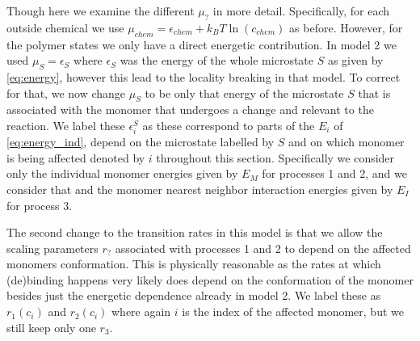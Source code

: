 \documentclass[11pt]{article}
\begin{document}
Though here we examine the different $\mu_?$ in more detail.
Specifically, for each outside chemical we use $\mu_{chem} = \epsilon_{chem}+\si{k_B}T\ln(c_{chem})$ as before.
However, for the polymer states we only have a direct energetic contribution.
In model 2 we used $\mu_S=\epsilon_S$ where $\epsilon_S$ was the energy of the whole microstate $S$ as given by \cref{eq:energy}, however this lead to the locality breaking in that model.
To correct for that, we now change $\mu_S$ to be only that energy of the microstate $S$ that is associated with the monomer that undergoes a change and relevant to the reaction.
We label these $\epsilon^S_i$ as these correspond to parts of the $E_i$ of \cref{eq:energy_ind}, depend on the microstate labelled by $S$ and on which monomer is being affected denoted by $i$ throughout this section.
Specifically we consider only the individual monomer energies given by $E_M$ for processes 1 and 2, and we consider that and the monomer nearest neighbor interaction energies given by $E_I$ for process 3.

The second change to the transition rates in this model is that we allow the scaling parameters $r_?$ associated with processes 1 and 2 to depend on the affected monomers conformation.
This is physically reasonable as the rates at which (de)binding happens very likely does depend on the conformation of the monomer besides just the energetic dependence already in model 2.
We label these as $r_1(c_i)$ and $r_2(c_i)$ where again $i$ is the index of the affected monomer, but we still keep only one $r_3$.
\end{document}

